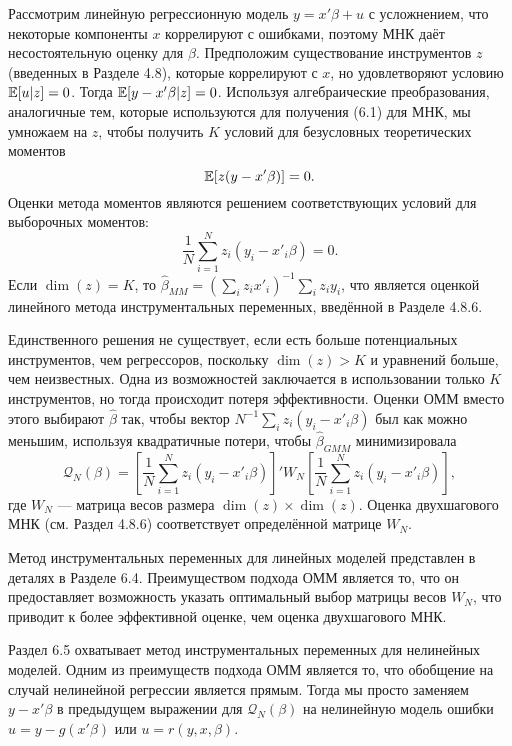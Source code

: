 Рассмотрим линейную регрессионную модель $y=x'\beta+u$ с усложнением, что некоторые компоненты $x$ коррелируют с ошибками, поэтому МНК даёт несостоятельную оценку для $\beta$. Предположим существование инструментов $z$ (введенных в Разделе 4.8), которые коррелируют с $x$, но удовлетворяют условию $\mathbb{E}[u|z]=0$. Тогда $\mathbb{E}[y-x'\beta|z]=0$. Используя алгебраические преобразования, аналогичные тем, которые используются для получения (6.1) для МНК, мы умножаем на $z$, чтобы получить $K$ условий для безусловных теоретических моментов
\begin{equation}
\mathbb{E}[z(y-x'\beta)]=0.
\end{equation}
Оценки метода моментов являются решением соответствующих условий для выборочных моментов:
\[
\frac{1}{N} \sum_{i=1}^{N} z_i(y_i-x'_i\beta)=0.
\]
Если $\dim(z)=K$, то $\hat{\beta}_{MM}= (\sum_i z_i x'_i)^{-1} \sum_i z_i y_i$, что является оценкой линейного метода инструментальных переменных, введённой в Разделе 4.8.6.

Единственного решения не существует, если есть больше потенциальных инструментов, чем регрессоров, поскольку $\dim(z)>K$ и уравнений больше, чем неизвестных. Одна из возможностей
заключается в использовании только $K$ инструментов, но тогда происходит потеря эффективности. Оценки ОММ вместо этого выбирают $\hat{\beta}$ так, чтобы вектор $N^{-1} \sum_i z_i(y_i-x'_i\beta)$ был как можно меньшим, используя квадратичные потери, чтобы $\hat{\beta}_{GMM}$ минимизировала
\begin{equation}
\mathcal{Q}_{N}(\beta)= \left[ \frac{1}{N} \sum_{i=1}^{N} z_i(y_i-x'_i\beta) \right]' W_N \left[ \frac{1}{N} \sum_{i=1}^{N} z_i(y_i-x'_i\beta) \right],
\end{equation}
где $W_N$ --- матрица весов размера $\dim(z) \times \dim(z)$. Оценка двухшагового МНК (см. Раздел 4.8.6) соответствует определённой матрице $W_N$.

Метод инструментальных переменных для линейных моделей представлен в деталях в Разделе 6.4. Преимуществом подхода ОММ является то, что он предоставляет возможность указать оптимальный выбор матрицы весов $W_N$, что приводит к более эффективной оценке, чем оценка двухшагового МНК.

Раздел 6.5 охватывает метод инструментальных переменных для нелинейных моделей. Одним из преимуществ подхода ОММ является то, что обобщение на случай нелинейной регрессии является прямым. Тогда мы просто заменяем $y-x'\beta$ в предыдущем выражении для $\mathcal{Q}_{N}(\beta)$ на нелинейную модель ошибки $u=y-g(x'\beta)$ или $u=r(y,x,\beta)$.

